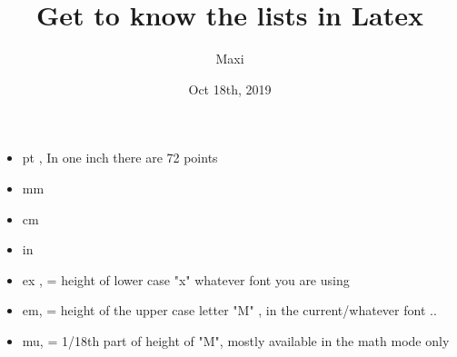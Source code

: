 \documentclass[a4paper,12pt]{article}
\title{Get to know the lists in Latex}
\author{Maxi}
\date{Oct 18th, 2019}
\begin{document}
	\maketitle
	\begin{itemize}
	\item pt , In one inch there are 72 points 
	\item mm
	\item cm
	\item in
	\item ex , = height of lower case "x" whatever font you are using
	\item em, = height of the upper case letter "M" , in the current/whatever font ..
	\item mu, = 1/18th part of height of "M", mostly available in the math mode only
	\end{itemize}
\end{document}
